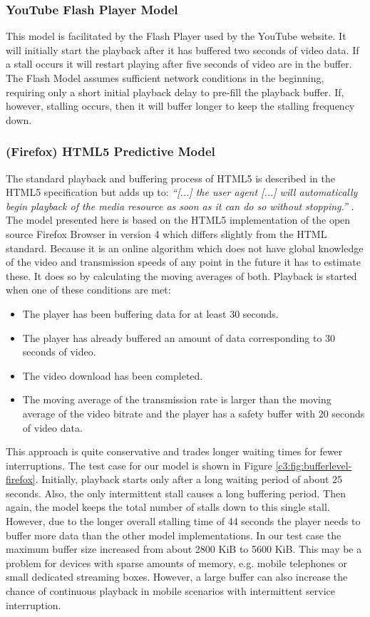 \subsubsection{YouTube Flash Player Model}


This model is facilitated by the Flash Player used by the YouTube website. It will initially start the playback after it has buffered two seconds of video data. If a stall occurs it will restart playing after five seconds of video are in the buffer.
The Flash Model assumes sufficient network conditions in the beginning, requiring only a short initial playback delay to pre-fill the playback buffer. If, however, stalling occurs, then it will buffer longer to keep the stalling frequency down.




\subsubsection{(Firefox) HTML5 Predictive Model}
The standard playback and buffering process of HTML5 is described in the HTML5 specification but adds up to:
\textit{``[...] the user agent [...] will automatically begin playback of the media resource as soon as it can do so without stopping.''} \cite{html5video}. The model presented here is based on the HTML5 implementation of the open source Firefox Browser in version 4 which differs slightly from the HTML standard. Because it is an online algorithm which does not have global knowledge of the video and transmission speeds of any point in the future it has to estimate these. It does so by calculating the moving averages of both. Playback is started when one of these conditions are met:

\begin{itemize}
\item The player has been buffering data for at least 30 seconds.
\item The player has already buffered an amount of data corresponding to 30 seconds of video.
\item The video download has been completed.
\item The moving average of the transmission rate is larger than the moving average of the video bitrate and the player has a safety buffer with 20 seconds of video data.
\end{itemize}

This approach is quite conservative and trades longer waiting times for fewer interruptions. The test case for our model is shown in Figure \ref{c3:fig:bufferlevel-firefox}. Initially, playback starts only after a long waiting period of about 25 seconds. Also, the only intermittent stall causes a long buffering period. Then again, the model keeps the total number of stalls down to this single stall. However, due to the longer overall stalling time of 44 seconds the player needs to buffer more data than the other model implementations. In our test case the maximum buffer size increased from about 2800 KiB to 5600 KiB. This may be a problem for devices with sparse amounts of memory, e.g. mobile telephones or small dedicated streaming boxes. However, a large buffer can also increase the chance of continuous playback in mobile scenarios with intermittent service interruption.


